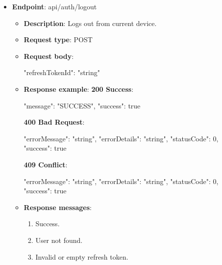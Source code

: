\begin{itemize}
    \item \textbf{Endpoint}: api/auth/logout
    \begin{itemize}
        \item \textbf{Description}: Logs out from current device.
        \item \textbf{Request type}: POST
        \item \textbf{Request body}:
        \begin{spverbatim}
        {
            "refreshTokenId": "string"
        }
        \end{spverbatim}
        \item \textbf{Response example}:
        \textbf{200 Success}:
        \begin{spverbatim}
        {
            "message": "SUCCESS",
            "success": true
        }
        \end{spverbatim}
        \textbf{400 Bad Request}:
        \begin{spverbatim}
        {
            "errorMessage": "string",
            "errorDetails": "string",
            "statusCode": 0,
            "success": true
        }
        \end{spverbatim}
        \textbf{409 Conflict}:
        \begin{spverbatim}
        {
            "errorMessage": "string",
            "errorDetails": "string",
            "statusCode": 0,
            "success": true
        }
        \end{spverbatim}
        \item \textbf{Response messages}:
        \begin{enumerate}
            \item Success.
            \item User not found.
            \item Invalid or empty refresh token.
        \end{enumerate}
    \end{itemize}


\end{itemize}

